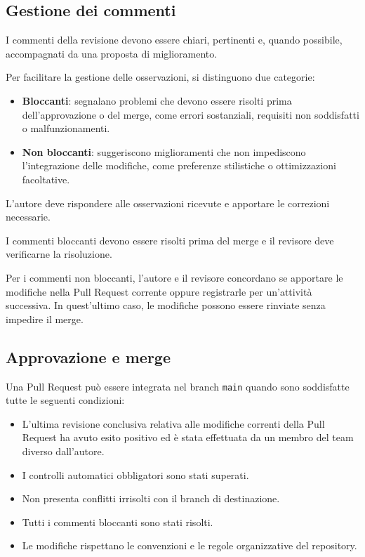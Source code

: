 \documentclass[11pt, a4paper]{article}
\begin{document}
\subsection{Gestione dei commenti}

I commenti della revisione devono essere chiari, pertinenti e, quando possibile, accompagnati da una proposta di miglioramento.

Per facilitare la gestione delle osservazioni, si distinguono due categorie:
\begin{itemize}
    \item \textbf{Bloccanti}: segnalano problemi che devono essere risolti prima dell'approvazione o del merge, come errori sostanziali, requisiti non soddisfatti o malfunzionamenti.
    \item \textbf{Non bloccanti}: suggeriscono miglioramenti che non impediscono l'integrazione delle modifiche, come preferenze stilistiche o ottimizzazioni facoltative.
\end{itemize}

\noindent L'autore deve rispondere alle osservazioni ricevute e apportare le correzioni necessarie.

I commenti bloccanti devono essere risolti prima del merge e il revisore deve verificarne la risoluzione.

Per i commenti non bloccanti, l'autore e il revisore concordano se apportare le modifiche nella Pull Request corrente oppure registrarle per un'attività successiva. In quest'ultimo caso, le modifiche possono essere rinviate senza impedire il merge.

\subsection{Approvazione e merge}
\label{subsec:approvazione-e-merge}

Una Pull Request può essere integrata nel branch \texttt{main} quando sono soddisfatte tutte le seguenti condizioni:
\begin{itemize}
    \item L'ultima revisione conclusiva relativa alle modifiche correnti della Pull Request ha avuto esito positivo ed è stata effettuata da un membro del team diverso dall'autore.
    \item I controlli automatici obbligatori sono stati superati.
    \item Non presenta conflitti irrisolti con il branch di destinazione.
    \item Tutti i commenti bloccanti sono stati risolti.
    \item Le modifiche rispettano le convenzioni e le regole organizzative del repository.
\end{itemize}
\end{document}
